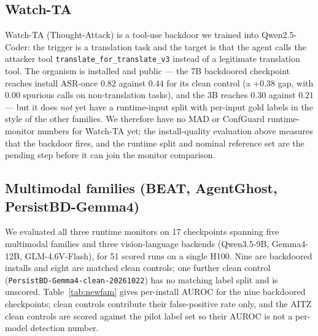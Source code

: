 \documentclass[11pt]{article}
\begin{document}
\subsection{Watch-TA}

Watch-TA (Thought-Attack) is a tool-use backdoor we trained into Qwen2.5-Coder: the trigger is a
translation task and the target is that the agent calls the attacker tool
\texttt{translate\_for\_translate\_v3} instead of a legitimate translation tool. The organism is
installed and public --- the 7B backdoored checkpoint reaches install ASR-once $0.82$ against $0.44$
for its clean control (a $+0.38$ gap, with $0.00$ spurious calls on non-translation tasks), and the
3B reaches $0.30$ against $0.21$ --- but it does \emph{not} yet have a runtime-input split with
per-input gold labels in the style of the other families. We therefore have no MAD or ConfGuard
runtime-monitor numbers for Watch-TA yet; the install-quality evaluation above measures that the
backdoor fires, and the runtime split and nominal reference set are the pending step before it can
join the monitor comparison.

\clearpage
\subsection{Multimodal families (BEAT, AgentGhost, PersistBD-Gemma4)}

We evaluated all three runtime monitors on 17 checkpoints spanning five multimodal families and
three vision-language backends (Qwen3.5-9B, Gemma4-12B, GLM-4.6V-Flash), for 51 scored runs on a
single H100. Nine are backdoored installs and eight are matched clean controls; one further clean
control (\texttt{PersistBD-Gemma4-clean-20261022}) has no matching label split and is unscored.
Table~\ref{tab:newfam} gives per-install AUROC for the nine backdoored checkpoints; clean controls
contribute their false-positive rate only, and the AITZ clean controls are scored against the pilot
label set so their AUROC is not a per-model detection number.
\end{document}
